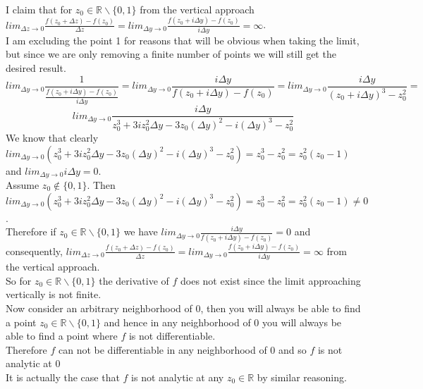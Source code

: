 \documentclass{article}
\begin{document}
\begin{center}
    \\I claim that for $z_0\in\mathbb{R}\backslash\{0, 1\}$ from the vertical approach $lim_{\Delta z\rightarrow 0}\frac{f(z_0 +\Delta z) - f(z_0)}{\Delta z} = lim_{\Delta y\rightarrow 0}\frac{f(z_0 + i\Delta y) - f(z_0)}{i\Delta y} =\infty$.
    \\I am excluding the point 1 for reasons that will be obvious when taking the limit, but since we are only removing a finite number of points we will still get the desired result.
    \[lim_{\Delta y\rightarrow 0}\frac{1}{\frac{f(z_0 + i\Delta y) - f(z_0)}{i\Delta y}} = lim_{\Delta y\rightarrow 0}\frac{i\Delta y}{f(z_0 + i\Delta y) - f(z_0)} = lim_{\Delta y\rightarrow 0}\frac{i\Delta y}{(z_0 + i\Delta y)^3 - z_0^2} =\]
    \[lim_{\Delta y\rightarrow 0}\frac{i\Delta y}{z_0^3 + 3i z_0^2\Delta y - 3z_0 (\Delta y)^2 - i(\Delta y)^3 - z_0^2}\]
    \break
    We know that clearly $lim_{\Delta y\rightarrow 0} (z_0^3 + 3i z_0^2\Delta y - 3z_0 (\Delta y)^2 - i(\Delta y)^3 - z_0^2) = z_0^3 - z_0^2 = z_0^2 (z_0 - 1)$ and $lim_{\Delta y\rightarrow 0} i\Delta y = 0$.
    \\Assume $z_0\notin\{0, 1\}$. Then $lim_{\Delta y\rightarrow 0} (z_0^3 + 3i z_0^2\Delta y - 3z_0 (\Delta y)^2 - i(\Delta y)^3 - z_0^2) = z_0^3 - z_0^2 = z_0^2 (z_0 - 1)\neq 0$.
    \\Therefore if $z_0\in\mathbb{R}\backslash\{0, 1\}$ we have $lim_{\Delta y\rightarrow 0}\frac{i\Delta y}{f(z_0 + i\Delta y) - f(z_0)} = 0$ and consequently, $lim_{\Delta z\rightarrow 0}\frac{f(z_0 +\Delta z) - f(z_0)}{\Delta z} = lim_{\Delta y\rightarrow 0}\frac{f(z_0 + i\Delta y) - f(z_0)}{i\Delta y} =\infty$ from the vertical approach.
    \\So for $z_0\in\mathbb{R}\backslash\{0, 1\}$ the derivative of $f$ does not exist since the limit approaching vertically is not finite.
    \\Now consider an arbitrary neighborhood of 0, then you will always be able to find a point $z_0\in\mathbb{R}\backslash\{0, 1\}$ and hence in any neighborhood of 0 you will always be able to find a point where $f$ is not differentiable.
    \\Therefore $f$ can not be differentiable in any neighborhood of 0 and so $f$ is not analytic at 0 \qedsymbol
    \\It is actually the case that $f$ is not analytic at any $z_0\in\mathbb{R}$ by similar reasoning.
\end{center}


\newpage
\end{document}
